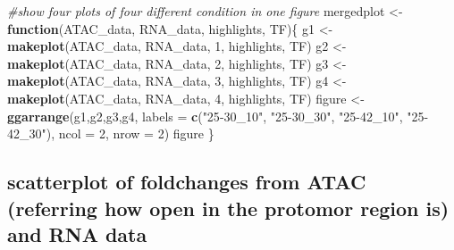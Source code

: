 \documentclass[
]{article}
\newenvironment{Shaded}{\begin{snugshade}}{\end{snugshade}}
\newcommand{\AttributeTok}[1]{\textcolor[rgb]{0.13,0.29,0.53}{#1}}
\newcommand{\CommentTok}[1]{\textcolor[rgb]{0.56,0.35,0.01}{\textit{#1}}}
\newcommand{\ControlFlowTok}[1]{\textcolor[rgb]{0.13,0.29,0.53}{\textbf{#1}}}
\newcommand{\DecValTok}[1]{\textcolor[rgb]{0.00,0.00,0.81}{#1}}
\newcommand{\FunctionTok}[1]{\textcolor[rgb]{0.13,0.29,0.53}{\textbf{#1}}}
\newcommand{\NormalTok}[1]{#1}
\newcommand{\OtherTok}[1]{\textcolor[rgb]{0.56,0.35,0.01}{#1}}
\newcommand{\StringTok}[1]{\textcolor[rgb]{0.31,0.60,0.02}{#1}}
\begin{document}
\begin{Shaded}
\begin{Highlighting}[]
\CommentTok{\#show four plots of four different condition in one figure}
\NormalTok{mergedplot }\OtherTok{\textless{}{-}} \ControlFlowTok{function}\NormalTok{(ATAC\_data, RNA\_data, highlights, TF)\{}
\NormalTok{  g1 }\OtherTok{\textless{}{-}} \FunctionTok{makeplot}\NormalTok{(ATAC\_data, RNA\_data, }\DecValTok{1}\NormalTok{, highlights, TF)}
\NormalTok{  g2 }\OtherTok{\textless{}{-}} \FunctionTok{makeplot}\NormalTok{(ATAC\_data, RNA\_data, }\DecValTok{2}\NormalTok{, highlights, TF)}
\NormalTok{  g3 }\OtherTok{\textless{}{-}} \FunctionTok{makeplot}\NormalTok{(ATAC\_data, RNA\_data, }\DecValTok{3}\NormalTok{, highlights, TF)}
\NormalTok{  g4 }\OtherTok{\textless{}{-}} \FunctionTok{makeplot}\NormalTok{(ATAC\_data, RNA\_data, }\DecValTok{4}\NormalTok{, highlights, TF)}
\NormalTok{  figure }\OtherTok{\textless{}{-}} \FunctionTok{ggarrange}\NormalTok{(g1,g2,g3,g4,}
                    \AttributeTok{labels =} \FunctionTok{c}\NormalTok{(}\StringTok{"25{-}30\_10"}\NormalTok{, }\StringTok{"25{-}30\_30"}\NormalTok{, }\StringTok{"25{-}42\_10"}\NormalTok{, }\StringTok{"25{-}42\_30"}\NormalTok{),}
                    \AttributeTok{ncol =} \DecValTok{2}\NormalTok{, }\AttributeTok{nrow =} \DecValTok{2}\NormalTok{)}
\NormalTok{  figure}
\NormalTok{\}}
\end{Highlighting}
\end{Shaded}

\hypertarget{scatterplot-of-foldchanges-from-atac-referring-how-open-in-the-protomor-region-is-and-rna-data}{%
\subsection{scatterplot of foldchanges from ATAC (referring how open in
the protomor region is) and RNA
data}\label{scatterplot-of-foldchanges-from-atac-referring-how-open-in-the-protomor-region-is-and-rna-data}}
\end{document}
